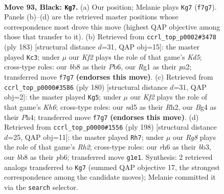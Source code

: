 \documentclass[11pt]{article}
\begin{document}
\clearpage

\begin{figure}[p]\centering
\begin{subfigure}{0.46\textwidth}\centering
\resizebox{\linewidth}{!}{%
\newchessgame
\chessboard[
  setfen={1B6/5k2/1P5R/3N4/P3B1b1/1K5p/8/6r1 b - - 8 93},
  showmover=false,
  pgfstyle=straightmove, color=movearrow, markmove={f7-g7}
]}
\caption{}
\end{subfigure}\hfill
\begin{subfigure}{0.46\textwidth}\centering
\resizebox{\linewidth}{!}{%
\newchessgame
\chessboard[
  setfen={8/8/1p1b4/8/3k1r2/8/P3RPK1/1B6 b - - 18 92},
  showmover=false,
  pgfstyle=straightmove, color=movearrow, markmove={d4-c3}
]}
\caption{}
\end{subfigure}
\\[4pt]
\begin{subfigure}{0.46\textwidth}\centering
\resizebox{\linewidth}{!}{%
\newchessgame
\chessboard[
  setfen={8/8/1Br3pK/P7/6pP/2kb4/7R/8 w - - 0 91},
  showmover=false,
  pgfstyle=straightmove, color=movearrow, markmove={h6-g5}
]}
\caption{}
\end{subfigure}\hfill
\begin{subfigure}{0.46\textwidth}\centering
\resizebox{\linewidth}{!}{%
\newchessgame
\chessboard[
  setfen={8/4k1b1/1p2p3/1B6/P7/1b2K3/7R/8 w - - 15 100},
  showmover=false,
  pgfstyle=straightmove, color=movearrow, markmove={h2-h7}
]}
\caption{}
\end{subfigure}
\caption{\textbf{Move 93, Black: \texttt{Kg7}.} (a) Our position; Melanie plays \texttt{Kg7} (\texttt{f7g7}). Panels (b)--(d) are the retrieved master positions whose correspondence most drove this move (highest QAP objective among those that transfer to it). (b) Retrieved from \texttt{ccrl\_top\_p0002\#3478} (ply 183) [structural distance $d$=31, QAP obj=15]: the master played \texttt{Kc3}; under $\mu$ our \emph{Kf2} plays the role of that game's \emph{Kd5}; cross-type roles: our \emph{b}b8 as their \emph{P}b6, our \emph{R}g1 as their \emph{p}a2; transferred move \texttt{f7g7} \textbf{(endorses this move)}. (c) Retrieved from \texttt{ccrl\_top\_p0000\#3586} (ply 180) [structural distance $d$=31, QAP obj=2]: the master played \texttt{Kg5}; under $\mu$ our \emph{Kf2} plays the role of that game's \emph{Kh6}; cross-type roles: our \emph{n}d5 as their \emph{R}h2, our \emph{B}g4 as their \emph{P}h4; transferred move \texttt{f7g7} \textbf{(endorses this move)}. (d) Retrieved from \texttt{ccrl\_top\_p0000\#1556} (ply 198) [structural distance $d$=25, QAP obj=11]: the master played \texttt{Rh7}; under $\mu$ our \emph{Rg8} plays the role of that game's \emph{Rh2}; cross-type roles: our \emph{r}h6 as their \emph{b}b3, our \emph{b}b8 as their \emph{p}b6; transferred move \texttt{g1e1}. Synthesis: 2 retrieved analogs transferred to \texttt{Kg7} (summed QAP objective 17, the strongest correspondence among the candidate moves); Melanie committed it via the \texttt{search} selector.}
\label{fig:thought-m185}
\end{figure}
\end{document}
